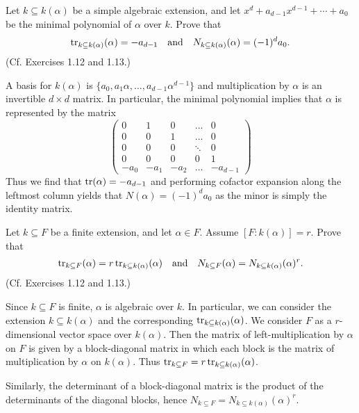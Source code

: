 \documentclass[../../master.tex]{subfiles}
\begin{document}
\begin{problem}
    Let $k \subseteq k(\alpha)$ be a simple algebraic extension, and let $x^{d} + a_{d-1}x^{d-1} + \cdots + a_0$ be the minimal polynomial of $\alpha$ over $k$.
    Prove that
    \begin{gather*}
        \operatorname{tr}_{k \subseteq k(\alpha)}(\alpha) = -a_{d-1} \quad \text{and} \quad N_{k \subseteq k(\alpha)}(\alpha) = (-1)^{d}a_0.
    \end{gather*}
    (Cf. Exercises 1.12 and 1.13.)
\end{problem}

\begin{solution}
    A basis for $k(\alpha)$ is $\{a_0, a_1 \alpha, \ldots, a_{d-1}\alpha^{d-1}\}$ and multiplication by $\alpha$ is an invertible $d \times d$ matrix.
    In particular, the minimal polynomial implies that $\alpha$ is represented by the matrix
    \[
    \begin{pmatrix}
        0 & 1 & 0 & \hdots & 0 \\
        0 & 0 & 1 & \hdots & 0 \\
        0 & 0 & 0 & \ddots & 0 \\
        0 & 0 & 0 & 0 & 1 \\
        -a_0 & -a_1 & -a_2 & \hdots & -a_{d-1}
    \end{pmatrix}
    \]
    Thus we find that $\operatorname{tr}(\alpha) = -a_{d-1}$ and performing cofactor expansion along the leftmost column yields that $N(\alpha) = (-1)^{d} a_0$ as the minor is simply the identity matrix.
\end{solution}

\begin{problem}
    Let $k \subseteq F$ be a finite extension, and let $\alpha \in F$.
    Assume $[F : k(\alpha)] = r$.
    Prove that
    \begin{gather*}
        \operatorname{tr}_{k \subseteq F}(\alpha) = r \operatorname{tr}_{k \subseteq k(\alpha)}(\alpha) \quad \text{and} \quad N_{k \subseteq F}(\alpha) = N_{k \subseteq k(\alpha)}(\alpha)^{r}.
    \end{gather*}
    (Cf. Exercises 1.12 and 1.13.)
\end{problem}

\begin{solution}
    Since $k \subseteq F$ is finite, $\alpha$ is algebraic over $k$.
    In particular, we can consider the extension $k \subseteq k(\alpha)$ and the corresponding $\operatorname{tr}_{k \subseteq k(\alpha)}(\alpha)$.
    We consider $F$ as a $r$-dimensional vector space over $k(\alpha)$.
    Then the matrix of left-multiplication by $\alpha$ on $F$ is given by a block-diagonal matrix in which each block is the matrix of multiplication by $\alpha$ on $k(\alpha)$.
    Thus $\operatorname{tr}_{k \subseteq F} = r \operatorname{tr}_{k \subseteq k(\alpha)}(\alpha)$.

    Similarly, the determinant of a block-diagonal matrix is the product of the determinants of the diagonal blocks, hence $N_{k \subseteq F} = N_{k \subseteq k(\alpha)}(\alpha)^{r}$.
\end{solution}
\end{document}
